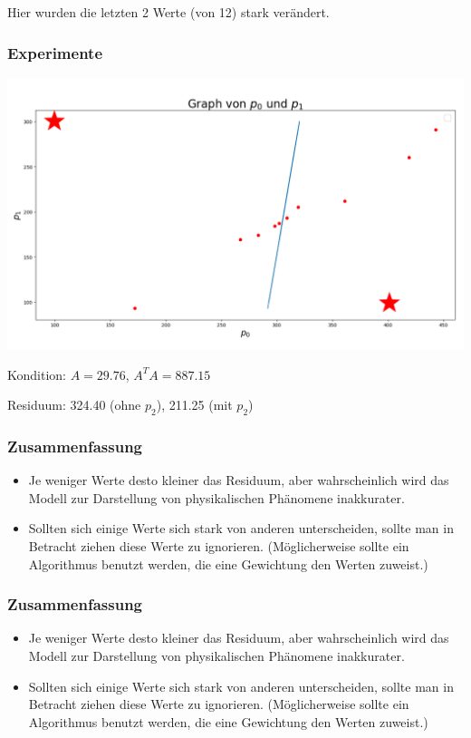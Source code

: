 \documentclass{beamer}
\begin{document}
\begin{frame}
Hier wurden die letzten 2 Werte (von 12) stark verändert.

\frametitle{Experimente}
\includegraphics[width=\textwidth]{plot2.png}

Kondition: $A = 29.76$, $A^T A = 887.15$

Residuum: 324.40 (ohne $p_2$), 211.25 (mit $p_2$)
\end{frame}


\begin{frame}
    \frametitle{Zusammenfassung}
    
    \begin{itemize}
    
    \item {\color{white}Je weniger Werte desto kleiner das Residuum, aber wahrscheinlich wird das Modell zur Darstellung von physikalischen Phänomene inakkurater.}
    \item {\color{white}Sollten sich einige Werte sich stark von anderen unterscheiden, sollte man in Betracht ziehen diese Werte zu ignorieren. (Möglicherweise sollte ein Algorithmus benutzt werden, die eine Gewichtung den Werten zuweist.)}
    \end{itemize}
    
\end{frame}


\begin{frame}
\frametitle{Zusammenfassung}

\begin{itemize}

\item Je weniger Werte desto kleiner das Residuum, aber wahrscheinlich wird das Modell zur Darstellung von physikalischen Phänomene inakkurater. 
\item {\color{white}Sollten sich einige Werte sich stark von anderen unterscheiden, sollte man in Betracht ziehen diese Werte zu ignorieren. (Möglicherweise sollte ein Algorithmus benutzt werden, die eine Gewichtung den Werten zuweist.)}
\end{itemize}

\end{frame}
\end{document}
